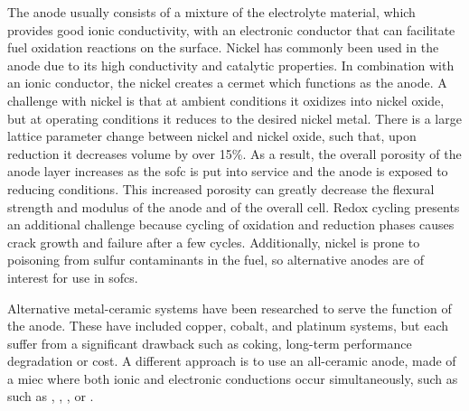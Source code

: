     The anode usually consists of a mixture of the electrolyte material, which provides good ionic conductivity, with an electronic conductor that can facilitate fuel oxidation reactions on the surface.
    Nickel has commonly been used in the anode due to its high conductivity and catalytic properties.%
    In combination with an ionic conductor, the nickel creates a cermet which functions as the anode.
    A challenge with nickel is that at ambient conditions it oxidizes into nickel oxide, but at operating conditions it reduces to the desired nickel metal.
    There is a large lattice parameter change between nickel and nickel oxide, such that, upon reduction it decreases volume by over 15\%.
    As a result, the overall porosity of the anode layer increases as the \gls{sofc} is put into service and the anode is exposed to reducing conditions.\cite{Gutierrez-Mora2002,Yu2007}
    This increased porosity can greatly decrease the flexural strength and modulus of the anode and of the overall cell.\cite{Callister2014,Barsoum2003}
    Redox cycling presents an additional challenge because cycling of oxidation and reduction phases causes crack growth and failure after a few cycles.\cite{Radovic2004, Radovic2004b, Laurencin2010, Pihlatie2009, Laurencin2009, Yu2007, Sarantaridis2007}
    Additionally, nickel is prone to poisoning from sulfur contaminants in the fuel, so alternative anodes are of interest for use in \glspl{sofc}.%

    Alternative metal-ceramic systems have been researched to serve the function of the anode.
    These have included copper, cobalt, and platinum systems, but each suffer from a significant drawback such as coking, long-term performance degradation or cost.%
    A different approach is to use an all-ceramic anode, made of a \gls{miec} where both ionic and electronic conductions occur simultaneously, such as such as , , , or .\cite{Goodenough2007,Zha2005,Primdahl2001,Hussain2013,MohammedHussain2012,Hussain2016,Huang2006}

